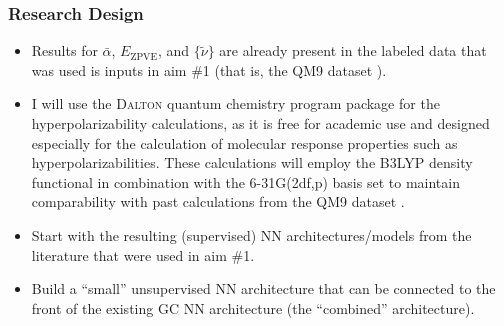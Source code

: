 \documentclass[12pt]{article}
\begin{document}
\subsubsection{Research Design}
\label{sec:orgca09e99}

\begin{itemize}
\item Results for \(\bar{\alpha}\), \(E_{\text{ZPVE}}\), and \(\{\tilde{\nu}\}\) are already present in the labeled data that was used is inputs in aim \#1 (that is, the QM9 dataset \cite{Ramakrishnan:2014ij}).

\item I will use the \textsc{Dalton} quantum chemistry program package \cite{daltonpaper} for the hyperpolarizability calculations, as it is free for academic use and designed especially for the calculation of molecular response properties such as hyperpolarizabilities. These calculations will employ the B3LYP density functional in combination with the 6-31G(2df,p) basis set to maintain comparability with past calculations from the QM9 dataset \cite{Ramakrishnan:2014ij}.

\item Start with the resulting (supervised) NN architectures/models from the literature that were used in aim \#1.

\item Build a ``small'' unsupervised NN architecture that can be connected to the front of the existing GC NN architecture (the ``combined'' architecture).
\end{itemize}
\end{document}
